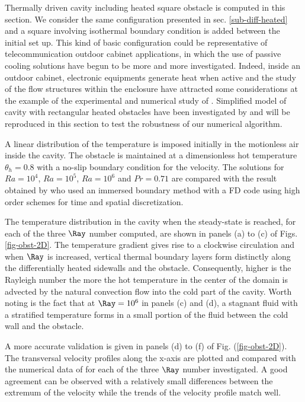 Thermally driven cavity including heated square obstacle is computed in this section.
We consider the same configuration presented in sec. \ref{sub-diff-heated} and a square involving isothermal boundary condition is added between the initial set up.
This kind of basic configuration could be representative of telecommunication outdoor cabinet applications, in which the use of passive cooling solutions have begun to be more and more investigated.
Indeed, inside an outdoor cabinet, electronic equipments generate heat when active and the study of the flow structures within the enclosure have attracted some considerations at the example of the experimental and numerical study of \cite{Raluca2013}.
Simplified model of cavity with rectangular heated obstacles have been investigated by \cite{Raluca2013} and will be reproduced in this section to test the robustness of our numerical algorithm.

A linear distribution of the temperature is imposed initially in the motionless air inside the cavity.
The obstacle is maintained at a dimensionless hot temperature $\theta_h = 0.8$ with a no-slip boundary condition for the velocity.
The solutions for $Ra = 10^4$, $Ra = 10^5$, $Ra = 10^6$ and $Pr = 0.71$ are compared with the result obtained by \cite{Raluca2013} who used an immersed boundary method with a FD code using high order schemes for time and spatial discretization.

The temperature distribution in the cavity when the steady-state is reached, for each of the three $\Ray$ number computed, are shown in panels (a) to (c) of Figs. \ref{fig-obst-2D}.
The temperature gradient gives rise to a clockwise circulation and when $\Ray$ is increased, vertical thermal boundary layers form distinctly along the differentially heated sidewalls and the obstacle.
Consequently, 
higher is the Rayleigh number the more the hot temperature in the center of the domain is advected by the natural convection flow into the cold part of the cavity. 
Worth noting is the fact that at $\Ray = 10^6$ in panels (c) and (d), a stagnant fluid with a stratified temperature forms in a small portion of the fluid between the cold wall and the obstacle.

A more accurate validation is given in panels (d) to (f) of Fig. (\ref{fig-obst-2D}).
The transversal velocity profiles along the x-axis are plotted and compared with the numerical data of \cite{Raluca2013} for each of the three $\Ray$ number investigated. 
A good agreement can be observed with a relatively small differences between the extremum of the velocity while the trends of the velocity profile match well.


